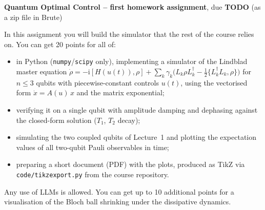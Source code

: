 \documentclass{article}
\begin{document}
\textbf{Quantum Optimal Control -- first homework assignment}, due \textbf{TODO} (as a zip file in Brute)

\vskip 1cm

In this assignment you will build the simulator that the rest of the course relies on.
You can get 20 points for all of:
\begin{itemize}
    \item in Python (\texttt{numpy}/\texttt{scipy} only), implementing a simulator of the Lindblad master equation
    $\dot\rho = -\mathrm{i}[H(u(t)),\rho] + \sum_k \gamma_k \big(L_k\rho L_k^\dagger - \tfrac12\{L_k^\dagger L_k,\rho\}\big)$
    for $n\le 3$ qubits with piecewise-constant controls $u(t)$, using the vectorised form $\dot x = A(u)\,x$ and the matrix exponential;
    \item verifying it on a single qubit with amplitude damping and dephasing against the closed-form solution ($T_1$, $T_2$ decay);
    \item simulating the two coupled qubits of Lecture~1 and plotting the expectation values of all two-qubit Pauli observables in time;
    \item preparing a short document (PDF) with the plots, produced as TikZ via \texttt{code/tikzexport.py} from the course repository.
\end{itemize}

Any use of LLMs is allowed. You can get up to 10 additional points for a visualisation of the Bloch ball shrinking under the dissipative dynamics.
\end{document}
